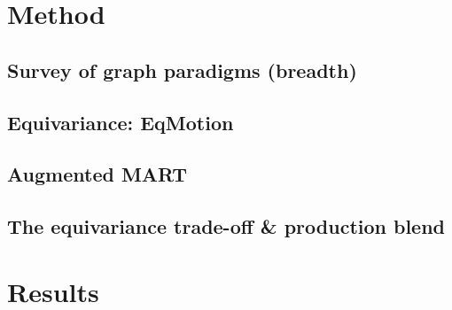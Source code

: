 \documentclass{article} %
\begin{document}
\section{Method}
\label{sec:method}

\subsection{Survey of graph paradigms (breadth)}
\label{sec:survey}

\subsection{Equivariance: EqMotion}
\label{sec:eqmotion}

\subsection{Augmented MART}
\label{sec:augmart}

\subsection{The equivariance trade-off \& production blend}
\label{sec:tradeoff}

\section{Results}
\label{sec:results}
\end{document}
